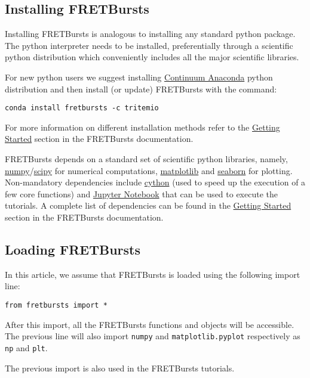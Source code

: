 \subsection{Installing FRETBursts}
\label{sec:install}
Installing FRETBursts is analogous to installing any standard python
package. The python interpreter needs to be installed, preferentially
through a scientific python distribution which conveniently includes 
all the major scientific libraries.

For new python users we suggest installing 
\href{https://store.continuum.io/cshop/anaconda/}{Continuum Anaconda}
python distribution and then install (or update) FRETBursts with the command:

\begin{verbatim}
conda install fretbursts -c tritemio
\end{verbatim}

For more information on different installation methods refer to the 
\href{http://fretbursts.readthedocs.org/en/latest/getting_started.html}{Getting Started}
section in the FRETBursts documentation.

FRETBursts depends on a standard set of scientific 
python libraries, namely, \href{http://www.numpy.org/}{numpy}/\href{http://www.scipy.org/}{scipy} for numerical computations, 
\href{http://matplotlib.org/}{matplotlib} and \href{http://stanford.edu/~mwaskom/software/seaborn/}{seaborn} for plotting. Non-mandatory dependencies include \href{http://cython.org/}{cython} (used to speed up the execution of a few core functions)
and \href{http://ipython.org/notebook.html}{Jupyter Notebook} that can be used
to execute the tutorials.
A complete list of dependencies can be found in the 
\href{http://fretbursts.readthedocs.org/en/latest/getting_started.html}{Getting Started}
section in the FRETBursts documentation.

\subsection{Loading FRETBursts}
\label{sec:import}
In this article, we assume that FRETBursts is loaded using the following 
import line:

\begin{verbatim}
from fretbursts import *
\end{verbatim}

After this import, all the FRETBursts functions and objects will be accessible.
The previous line will also import \verb|numpy| and \verb|matplotlib.pyplot|
respectively as \verb|np| and \verb|plt|.

The previous import is also used in the FRETBursts tutorials.